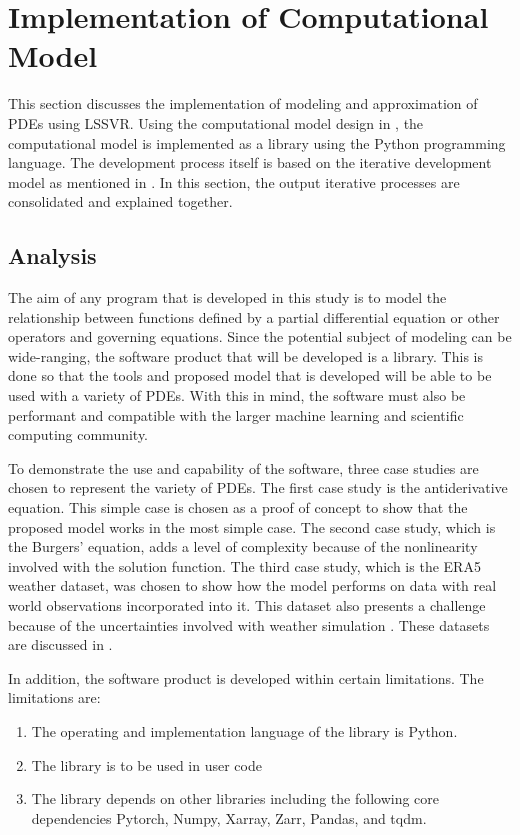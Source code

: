 \section{Implementation of Computational Model}
\noindent This section discusses the implementation of modeling and approximation of PDEs using LSSVR\@. Using the computational model design in , the computational model is implemented as a library using the Python programming language. The development process itself is based on the iterative development model as mentioned in . In this section, the output iterative processes are consolidated and explained together.

\subsection{Analysis}
\noindent The aim of any program that is developed in this study is to model the relationship between functions defined by a partial differential equation or other operators and governing equations. Since the potential subject of modeling can be wide-ranging, the software product that will be developed is a library. This is done so that the tools and proposed model that is developed will be able to be used with a variety of PDEs. With this in mind, the software must also be performant and compatible with the larger machine learning and scientific computing community.

To demonstrate the use and capability of the software, three case studies are chosen to represent the variety of PDEs. The first case study is the antiderivative equation. This simple case is chosen as a proof of concept to show that the proposed model works in the most simple case. The second case study, which is the Burgers' equation, adds a level of complexity because of the nonlinearity involved with the solution function. The third case study, which is the ERA5 weather dataset, was chosen to show how the model performs on data with real world observations incorporated into it. This dataset also presents a challenge because of the uncertainties involved with weather simulation \autocite{herreraReviewCurrentFuture2017}. These datasets are discussed in .

In addition, the software product is developed within certain limitations. The limitations are:
\begin{enumerate}
  \item The operating and implementation language of the library is Python.
  \item The library is to be used in user code
  \item The library depends on other libraries including the following core dependencies Pytorch, Numpy, Xarray, Zarr, Pandas, and tqdm.
\end{enumerate}

